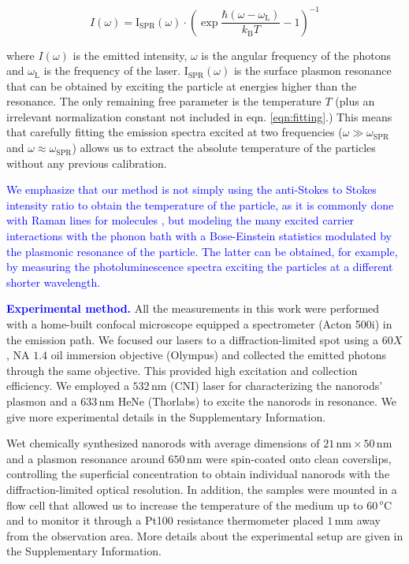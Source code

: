 \documentclass[journal=nalefd,manuscript=letter]{achemso}
\newcommand{\HI}[1]{\textcolor{blue}{#1}} %
\newcommand{\nm}{\ensuremath{\,\textrm{nm}}}
\newcommand{\mm}{\ensuremath{\,\textrm{mm}}}
\newcommand{\degree}{\ensuremath{\,^o\textrm{C}}}
\begin{document}
\begin{equation}\label{eqn:fitting}
	I(\omega) =
	\textrm{I}_{\textrm{SPR}}(\omega)\cdot\left(\exp\frac{\hbar(\omega-\omega_\textrm{L})}{k_\textrm{B}T}-1\right)^{-1}
\end{equation}

\noindent where $I(\omega) $ is the emitted intensity, $\omega$ is the angular frequency
of the photons and $\omega_\textrm{L}$ is the frequency of the laser.
$\textrm{I}_{\textrm{SPR}}(\omega) $ is the surface plasmon resonance that can be
obtained by exciting the particle at energies higher than the resonance. The
only remaining free parameter is the temperature $T$ (plus an irrelevant normalization
constant not included in eqn. \ref{eqn:fitting}.) This means that carefully
fitting the emission spectra excited at two frequencies
($\omega\gg\omega_{\textrm{SPR}}$ and $\omega\approx\omega_{\textrm{SPR}}$) allows us to
extract the absolute temperature of the particles without any previous
calibration.

\HI{We emphasize that our method is not simply using the anti-Stokes to Stokes intensity ratio to 
obtain the temperature of the particle, as it is commonly done with Raman lines for molecules 
\cite{krishnan1928influence,zondervan2006single}, but modeling the many excited carrier interactions
with the phonon bath with a Bose-Einstein statistics modulated by the plasmonic resonance of the particle. 
The latter can be obtained, for example, by measuring the photoluminescence spectra exciting the particles
at a different shorter wavelength.}

\HI{\textbf{Experimental method.}} All the measurements in this work were performed with a home-built confocal
microscope equipped a spectrometer (Acton 500i) in the emission path.  We focused
our lasers to a diffraction-limited spot using a $60X$, NA $1.4$ oil immersion
objective (Olympus) and collected the emitted photons through the same
objective. This provided high excitation and collection efficiency.
We employed a $532\nm$ (CNI) laser for characterizing the nanorods' plasmon and
a $633\nm$ HeNe (Thorlabs) to excite the nanorods in resonance.
We give more experimental details in the Supplementary Information.

Wet chemically synthesized nanorods\cite{Nikoobakht2003} with average dimensions
of $21\nm\times50\nm$ and a plasmon resonance around $650\nm$ were spin-coated
onto clean coverslips, controlling the superficial concentration to obtain
individual nanorods with the diffraction-limited optical resolution.
In addition, the samples were mounted in a flow cell that allowed us to increase
the temperature of the medium up to $60\degree$ and to monitor it through a
Pt100 resistance thermometer placed $1\mm$ away from the observation area. More
details about the experimental setup are given in the Supplementary Information.
\end{document}
